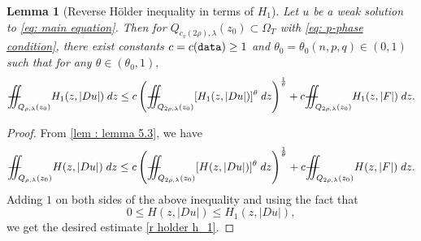 \documentclass[11pt,oneside, english,reqno,twoside a4paper]{amsart}
\newtheorem{lemma}{Lemma}[section]
\theoremstyle{definition}
\numberwithin{theorem}{section}
\numberwithin{equation}{section}
\newcommand{\iintss}{{\int\hspace{-0.28cm}\int}}
\newcommand{ \miints }{{\iintss\hspace{-0.56cm} -\hspace{-0.15cm}-}}
\newcommand{\miint}[1]{{\miints_{\hspace{-0.13cm}#1}}}
\begin{document}
\begin{lemma}[Reverse H\"{o}lder inequality in terms of $H_1$]\label{lem: reverse holder H_1}
Let $u$ be a weak solution to \eqref{eq: main equation}. Then for $Q_{c_v(2 \rho),\lambda}\left(z_0\right) \subset \Omega_T$ with \eqref{eq: p-phase condition}, there exist constants $c=c(\textnormal{\texttt{data}}) \geq 1$ and $\theta_0=\theta_0(n,p,q) \in (0,1)$ such that for any $\theta\in (\theta_0,1),$
\begin{align}\label{r holder h_1}
\miint{Q_{\rho,\lambda}(z_0)} H_1(z,|Du|)\; dz \leq c \left(\miint{Q_{2\rho,\lambda}(z_0)} [H_1(z,|Du|)]^\theta\;dz\right)^\frac{1}{\theta}+c\miint{Q_{2\rho,\lambda}(z_0)} H_1(z,|F|)\; dz.
\end{align}
\end{lemma}
\begin{proof}
 From \cref{lem : lemma 5.3}, we have 
 \begin{align*}
\miint{Q_{\rho,\lambda}(z_0)} H(z,|Du|)\; dz \leq c \left(\miint{Q_{2\rho,\lambda}(z_0)} [H(z,|Du|)]^\theta\;dz\right)^\frac{1}{\theta}+c\miint{Q_{2\rho,\lambda}(z_0)} H(z,|F|)\; dz.
\end{align*}
Adding $1$ on both sides of the above inequality and using the fact that $$0\leq H(z, |Du|)\leq H_1(z, |Du|),$$ we get the desired estimate \eqref{r holder h_1}.
\end{proof}
\end{document}
